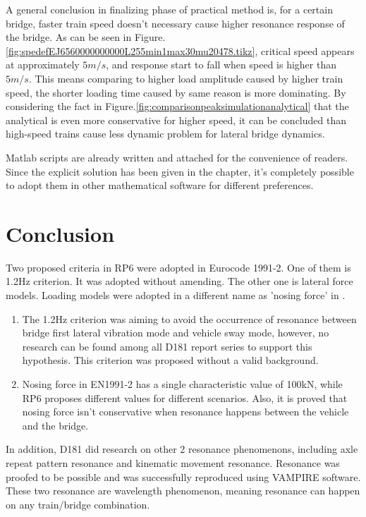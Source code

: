 A general conclusion in finalizing phase of practical method is, for a certain bridge, faster train speed doesn't necessary cause higher resonance response of the bridge. As can be seen in Figure.\ref{fig:spedefEJ6560000000000L255min1max30mu20478.tikz}, critical speed appears at approximately $5m/s$, and response start to fall when speed is higher than $5m/s$. This means comparing to higher load amplitude caused by higher train speed, the shorter loading time caused by same reason is more dominating. By considering the fact in Figure.\ref{fig:comparisonpeaksimulationanalytical} that the analytical is even more conservative for higher speed, it can be concluded than high-speed trains cause less dynamic problem for lateral bridge dynamics.

Matlab scripts are already written and attached for the convenience of readers. Since the explicit solution has been given in the chapter, it's completely possible to adopt them in other mathematical software for different preferences.

\chapter{Conclusion}


Two proposed criteria in RP6\citet{d181} were adopted in Eurocode 1991-2. One of them is 1.2Hz criterion. It was adopted without amending. The other one is lateral force models. Loading models were adopted in a different name as 'nosing force' in \citet[A6.5.2]{EC12}. 

\begin{enumerate}[-]
\item The 1.2Hz criterion was aiming to avoid the occurrence of resonance between bridge first lateral vibration mode and vehicle sway mode, however, no research can be found among all D181 report series to support this hypothesis. This criterion was proposed without a valid background.

\item Nosing force in EN1991-2 has a single characteristic value of 100kN, while RP6 proposes different values for different scenarios. Also, it is proved that nosing force isn't conservative when resonance happens between the vehicle and the bridge.
\end{enumerate}

In addition, D181 did research on other 2 resonance phenomenons, including axle repeat pattern resonance and kinematic movement resonance. Resonance was proofed to be possible and was successfully reproduced using VAMPIRE software. These two resonance are wavelength phenomenon, meaning resonance can happen on any train/bridge combination.

